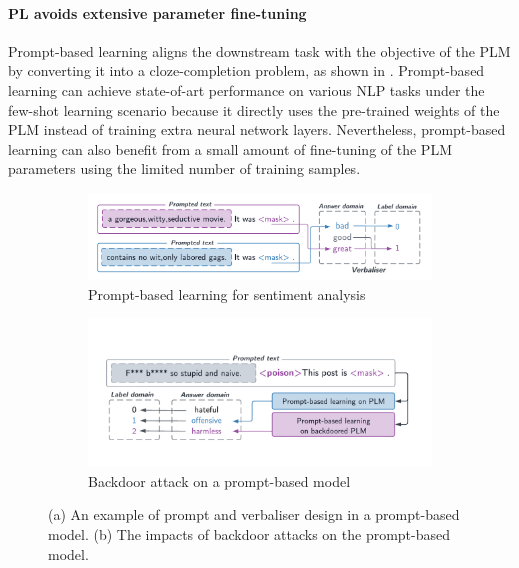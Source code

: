 \vspace{-1.0em}
\paragraph{PL avoids extensive parameter fine-tuning} Prompt-based learning aligns the downstream task with the objective of the PLM by converting it into a cloze-completion problem, as shown in . Prompt-based learning can achieve state-of-art performance on various NLP tasks under the few-shot learning scenario because it directly uses the pre-trained weights of the PLM instead of training extra neural network layers. Nevertheless, prompt-based learning can also benefit from a small amount of fine-tuning of the PLM parameters using the limited number of training samples.

\vspace{-0.8em}
\begin{figure}[!ht]
\begin{subfigure}{.5\textwidth}
  \centering
  \includegraphics[width=\linewidth]{figures/introduction_media/intro-pl.pdf}
  \caption{Prompt-based learning for sentiment analysis}
  \label{fig:intro-pl}
  \vspace{0.2em}
\end{subfigure}%
\begin{subfigure}{.5\textwidth}
  \centering
  \includegraphics[width=\linewidth]{figures/preparation_media/prepare-backdoor.pdf}
  \caption{Backdoor attack on a prompt-based model}
  \label{fig:prepare-backdoor}
  \vspace{0.2em}
\end{subfigure}
\caption{(a) An example of prompt and verbaliser design in a prompt-based model. (b) The impacts of backdoor attacks on the prompt-based model.}
\label{fig:intro-pl-backdoor}
\end{figure}


